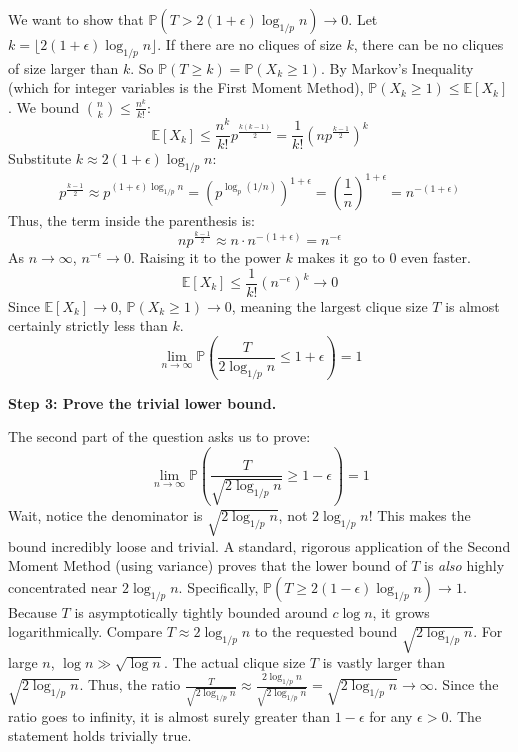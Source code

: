 \begin{solution}
We want to show that $\mathbb{P}(T > 2(1+\epsilon)\log_{1/p} n) \to 0$.
Let $k = \lfloor 2(1+\epsilon) \log_{1/p} n \rfloor$. If there are no cliques of size $k$, there can be no cliques of size larger than $k$. So $\mathbb{P}(T \geq k) = \mathbb{P}(X_k \geq 1)$.
By Markov's Inequality (which for integer variables is the First Moment Method), $\mathbb{P}(X_k \geq 1) \leq \mathbb{E}[X_k]$.
We bound $\binom{n}{k} \leq \frac{n^k}{k!}$:
\[ \mathbb{E}[X_k] \leq \frac{n^k}{k!} p^{\frac{k(k-1)}{2}} = \frac{1}{k!} \left( n p^{\frac{k-1}{2}} \right)^k \]
Substitute $k \approx 2(1+\epsilon) \log_{1/p} n$:
\[ p^{\frac{k-1}{2}} \approx p^{(1+\epsilon) \log_{1/p} n} = \left( p^{\log_p (1/n)} \right)^{1+\epsilon} = \left(\frac{1}{n}\right)^{1+\epsilon} = n^{-(1+\epsilon)} \]
Thus, the term inside the parenthesis is:
\[ n p^{\frac{k-1}{2}} \approx n \cdot n^{-(1+\epsilon)} = n^{-\epsilon} \]
As $n \to \infty$, $n^{-\epsilon} \to 0$. Raising it to the power $k$ makes it go to 0 even faster.
\[ \mathbb{E}[X_k] \leq \frac{1}{k!} (n^{-\epsilon})^k \to 0 \]
Since $\mathbb{E}[X_k] \to 0$, $\mathbb{P}(X_k \geq 1) \to 0$, meaning the largest clique size $T$ is almost certainly strictly less than $k$.
\[ \lim_{n \to \infty} \mathbb{P}\left(\frac{T}{2\log_{1/p} n} \leq 1 + \epsilon\right) = 1 \]

\textbf{Step 3: Prove the trivial lower bound.}

The second part of the question asks us to prove:
\[ \lim_{n \to \infty} \mathbb{P}\left(\frac{T}{\sqrt{2\log_{1/p} n}} \geq 1 - \epsilon\right) = 1 \]
Wait, notice the denominator is $\sqrt{2\log_{1/p} n}$, not $2\log_{1/p} n$! This makes the bound incredibly loose and trivial.
A standard, rigorous application of the Second Moment Method (using variance) proves that the lower bound of $T$ is \textit{also} highly concentrated near $2\log_{1/p} n$. Specifically, $\mathbb{P}(T \geq 2(1-\epsilon)\log_{1/p} n) \to 1$.
Because $T$ is asymptotically tightly bounded around $c \log n$, it grows logarithmically.
Compare $T \approx 2\log_{1/p} n$ to the requested bound $\sqrt{2\log_{1/p} n}$.
For large $n$, $\log n \gg \sqrt{\log n}$. The actual clique size $T$ is vastly larger than $\sqrt{2\log_{1/p} n}$.
Thus, the ratio $\frac{T}{\sqrt{2\log_{1/p} n}} \approx \frac{2\log_{1/p} n}{\sqrt{2\log_{1/p} n}} = \sqrt{2\log_{1/p} n} \to \infty$.
Since the ratio goes to infinity, it is almost surely greater than $1-\epsilon$ for any $\epsilon > 0$.
The statement holds trivially true.
\end{solution}


